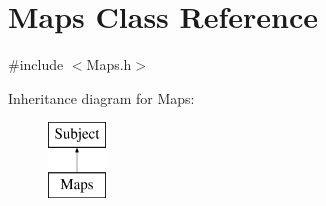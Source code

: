 \hypertarget{class_maps}{}\section{Maps Class Reference}
\label{class_maps}


{\ttfamily \#include $<$Maps.\+h$>$}

Inheritance diagram for Maps\+:\begin{figure}[H]
\begin{center}
\leavevmode
\includegraphics[height=2.000000cm]{class_maps}
\end{center}
\end{figure}
